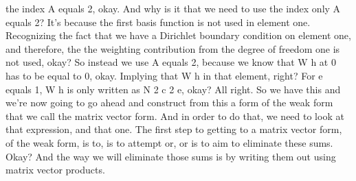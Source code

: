 \documentclass[10pt]{article}
\begin{document}
the index A equals 2, okay. And why is it that we need to use the index only A equals 2? It's because the first basis function is not used in element one. Recognizing the fact that we have a Dirichlet boundary condition on element one, and therefore, the the weighting contribution from the degree of freedom one is not used, okay? So instead we use A equals 2, because we know that W h at 0 has to be equal to 0, okay. Implying that W h in that element, right? For e equals 1, W h is only written as N 2 c 2 e, okay? All right. So we have this and we're now going to go ahead and construct from this a form of the weak form that we call the matrix vector form. And in order to do that, we need to look at that expression, and that one. The first step to getting to a matrix vector form, of the weak form, is to, is to attempt or, or is to aim to eliminate these sums. Okay? And the way we will eliminate those sums is by writing them out using matrix vector products.
\end{document}
